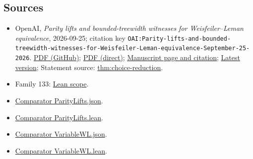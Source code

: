 \documentclass[11pt]{article}
\begin{document}
\subsection{Sources}
\begin{itemize}
\item OpenAI, \emph{Parity lifts and bounded-treewidth witnesses for Weisfeiler–Leman equivalence}, 2026-09-25; citation key \texttt{OAI:Parity-lifts-and-bounded-treewidth-witnesses-for-Weisfeiler-Leman-equivalence-September-25-2026}. \href{https://github.com/openai/math/blob/adc7f1241b42e322a6451854ab7e4b4c146bf78a/preprints/Parity-lifts-and-bounded-treewidth-witnesses-for-Weisfeiler-Leman-equivalence-September-25-2026/paper.pdf}{PDF (GitHub)}; \href{https://github.com/openai/math/raw/adc7f1241b42e322a6451854ab7e4b4c146bf78a/preprints/Parity-lifts-and-bounded-treewidth-witnesses-for-Weisfeiler-Leman-equivalence-September-25-2026/paper.pdf}{PDF (direct)}; \href{https://github.com/openai/math/blob/adc7f1241b42e322a6451854ab7e4b4c146bf78a/preprints/Parity-lifts-and-bounded-treewidth-witnesses-for-Weisfeiler-Leman-equivalence-September-25-2026/README.md}{Manuscript page and citation}; \href{https://github.com/openai/math/blob/main/preprints/Parity-lifts-and-bounded-treewidth-witnesses-for-Weisfeiler-Leman-equivalence-September-25-2026/paper.pdf}{Latest version}; Statement source: \href{https://github.com/openai/math/blob/adc7f1241b42e322a6451854ab7e4b4c146bf78a/preprints/Parity-lifts-and-bounded-treewidth-witnesses-for-Weisfeiler-Leman-equivalence-September-25-2026/build/sections/01-introduction.tex\#L76}{thm:choice-reduction}.
\item Family 133: \href{https://github.com/openai/math/blob/adc7f1241b42e322a6451854ab7e4b4c146bf78a/lean/docs/133.md}{Lean scope}.
\item \href{https://github.com/openai/math/blob/adc7f1241b42e322a6451854ab7e4b4c146bf78a/lean/ComparatorChallenges/ParityLifts.json}{Comparator ParityLifts.json}.
\item \href{https://github.com/openai/math/blob/adc7f1241b42e322a6451854ab7e4b4c146bf78a/lean/ComparatorChallenges/ParityLifts.lean}{Comparator ParityLifts.lean}.
\item \href{https://github.com/openai/math/blob/adc7f1241b42e322a6451854ab7e4b4c146bf78a/lean/ComparatorChallenges/VariableWL.json}{Comparator VariableWL.json}.
\item \href{https://github.com/openai/math/blob/adc7f1241b42e322a6451854ab7e4b4c146bf78a/lean/ComparatorChallenges/VariableWL.lean}{Comparator VariableWL.lean}.

\end{itemize}
\end{document}
